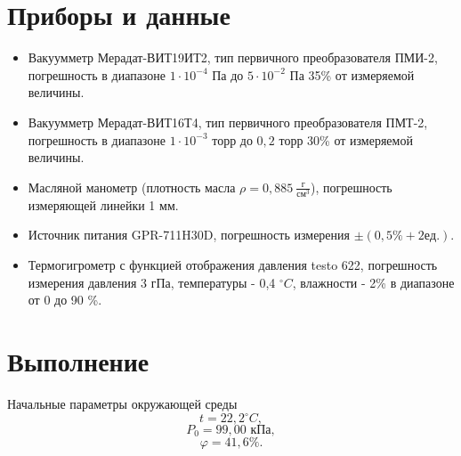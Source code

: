 \documentclass[a4paper]{article}
\begin{document}
\section{Приборы и данные}
\begin{itemize}
    \item Вакуумметр Мерадат-ВИТ19ИТ2, тип первичного преобразователя ПМИ-2, погрешность в диапазоне $1\cdot10^{-4}$ Па до $5\cdot10^{-2}$ Па 35\% от измеряемой величины.
	\item Вакуумметр Мерадат-ВИТ16Т4, тип первичного преобразователя ПМТ-2, погрешность в диапазоне $1\cdot10^{-3}$ торр до $0,2$ торр 30\% от измеряемой величины.
	\item Масляной манометр (плотность масла $\rho = 0,885 \ \frac{\text{г}}{\text{см}^3}$), погрешность измеряющей линейки 1 мм.
	\item Источник питания GPR-711H30D, погрешность измерения $\pm(0,5 \% +2 ед.)$.
	\item Термогигрометр с функцией отображения давления testo 622, погрешность измерения давления 3 гПа, температуры - 0,4 $^\circ C$, влажности - 2\% в диапазоне от 0 до 90 \%.
\end{itemize}

\section{Выполнение}


Начальные параметры окружающей среды
\begin{equation*}
	t = 22,2 ^\circ C,
\end{equation*}
\begin{equation*}
	P_0 = 99,00 \text{ кПа},
\end{equation*}
\begin{equation*}
	\varphi = 41,6 \%.
\end{equation*}
\end{document}
